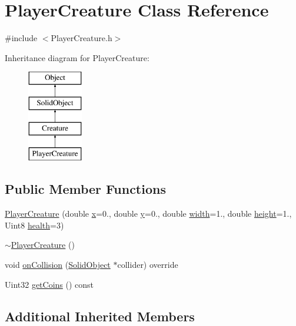 \hypertarget{class_player_creature}{}\section{Player\+Creature Class Reference}
\label{class_player_creature}


{\ttfamily \#include $<$Player\+Creature.\+h$>$}

Inheritance diagram for Player\+Creature\+:\begin{figure}[H]
\begin{center}
\leavevmode
\includegraphics[height=4.000000cm]{class_player_creature}
\end{center}
\end{figure}
\subsection*{Public Member Functions}
\begin{DoxyCompactItemize}
\item 
\hyperlink{class_player_creature_a2b9afd7492db1bbe07f71694206156fe}{Player\+Creature} (double \hyperlink{class_object_a02010c1708632be33a760486b1f648f8}{x}=0., double \hyperlink{class_object_a542c4d6094ace575fb4a28f46b9cc6a1}{y}=0., double \hyperlink{class_object_a3afad0ab476968e517b6f48c2a32719f}{width}=1., double \hyperlink{class_object_a811bf2cbf614c4f0a3935a83fb639ffd}{height}=1., Uint8 \hyperlink{class_creature_a312bc862a499a3955e74b5215d3bd1c5}{health}=3)
\item 
\hyperlink{class_player_creature_ab11d768b4acd8a72743439db9778569d}{$\sim$\+Player\+Creature} ()
\item 
void \hyperlink{class_player_creature_a01695a024ca8239d77940df317b1d880}{on\+Collision} (\hyperlink{class_solid_object}{Solid\+Object} $\ast$collider) override
\item 
Uint32 \hyperlink{class_player_creature_a8a36503e510bbd6795031385e30ec362}{get\+Coins} () const 
\end{DoxyCompactItemize}
\subsection*{Additional Inherited Members}



